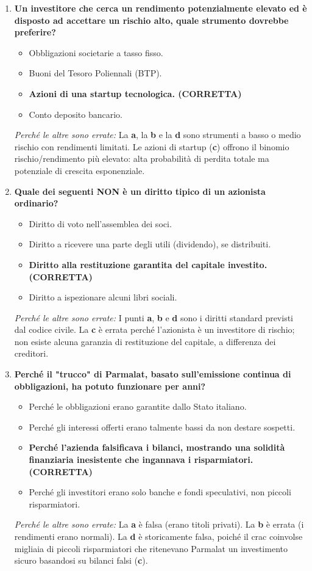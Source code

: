 \documentclass[a4paper,12pt]{article}
\begin{document}
\begin{enumerate}[start=6]
		\item \textbf{Un investitore che cerca un rendimento potenzialmente elevato ed è disposto ad accettare un rischio alto, quale strumento dovrebbe preferire?}
		\begin{itemize}
			\item[a)] Obbligazioni societarie a tasso fisso.
			\item[b)] Buoni del Tesoro Poliennali (BTP).
			\item[c)] \textbf{Azioni di una startup tecnologica. (CORRETTA)}
			\item[d)] Conto deposito bancario.
		\end{itemize}
		\textit{Perché le altre sono errate:} La \textbf{a}, la \textbf{b} e la \textbf{d} sono strumenti a basso o medio rischio con rendimenti limitati. Le azioni di startup (\textbf{c}) offrono il binomio rischio/rendimento più elevato: alta probabilità di perdita totale ma potenziale di crescita esponenziale.
		
		\item \textbf{Quale dei seguenti NON è un diritto tipico di un azionista ordinario?}
		\begin{itemize}
			\item[a)] Diritto di voto nell'assemblea dei soci.
			\item[b)] Diritto a ricevere una parte degli utili (dividendo), se distribuiti.
			\item[c)] \textbf{Diritto alla restituzione garantita del capitale investito. (CORRETTA)}
			\item[d)] Diritto a ispezionare alcuni libri sociali.
		\end{itemize}
		\textit{Perché le altre sono errate:} I punti \textbf{a}, \textbf{b} e \textbf{d} sono i diritti standard previsti dal codice civile. La \textbf{c} è errata perché l'azionista è un investitore di rischio; non esiste alcuna garanzia di restituzione del capitale, a differenza dei creditori.
		
		\item \textbf{Perché il "trucco" di Parmalat, basato sull'emissione continua di obbligazioni, ha potuto funzionare per anni?}
		\begin{itemize}
			\item[a)] Perché le obbligazioni erano garantite dallo Stato italiano.
			\item[b)] Perché gli interessi offerti erano talmente bassi da non destare sospetti.
			\item[c)] \textbf{Perché l'azienda falsificava i bilanci, mostrando una solidità finanziaria inesistente che ingannava i risparmiatori. (CORRETTA)}
			\item[d)] Perché gli investitori erano solo banche e fondi speculativi, non piccoli risparmiatori.
		\end{itemize}
		\textit{Perché le altre sono errate:} La \textbf{a} è falsa (erano titoli privati). La \textbf{b} è errata (i rendimenti erano normali). La \textbf{d} è storicamente falsa, poiché il crac coinvolse migliaia di piccoli risparmiatori che ritenevano Parmalat un investimento sicuro basandosi su bilanci falsi (\textbf{c}).
		
	\end{enumerate}
\end{document}
